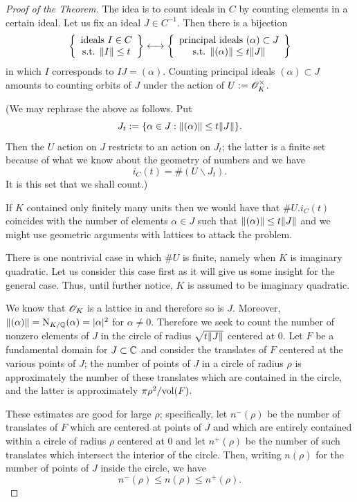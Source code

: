 \documentclass[10pt,a4paper,reqno]{amsart}
\begin{document}
\begin{proof}[Proof of the Theorem]
The idea is to count ideals in $C$ by counting elements in a certain ideal.
Let us fix an ideal $J \in C^{-1}$. Then there is a bijection
\[ \left\{
\begin{array}{c}
    \text{ideals } I \in C \\
    \text{s.t. } \| I\| \le t
\end{array}
\right\} \longleftrightarrow
\left\{
\begin{array}{c}
    \text{principal ideals } (\alpha) \subset J \\
    \text{s.t. } \| (\alpha)\| \le t\| J\|
\end{array}
\right\} \] in which $I$ corresponds to $IJ = (\alpha)$. Counting principal
ideals $(\alpha) \subset J$ amounts to counting orbits of $J$ under the action
of $U := \mathscr{O}_K^{\times}$.

(We may rephrase the above as follows. Put \[J_t := \{\alpha\in J :
\| (\alpha)\| \le t\| J\|\}.\] Then the $U$ action on $J$ restricts to an
action on $J_t$; the latter is a finite set because of what we know about the
geometry of numbers and we have \[i_C(t) = \#(U \backslash J_t). \] It is this
set that we shall count.)

If $K$ contained only finitely many units then we would have that $\#U .
i_C(t)$ coincides with the number of elements $\alpha \in J$ such that
$\| (\alpha)\| \le t \| J\|$ and we might use geometric arguments with
lattices to attack the problem.

There is one nontrivial case in which $\#U$ is finite, namely when $K$ is
imaginary quadratic. Let us consider this case first as it will give us some
insight for the general case. Thus, until further notice, $K$ is assumed to be
imaginary quadratic.

We know that $\mathscr{O}_K$ is a lattice in \C{} and therefore so is $J$. Moreover,
$\| (\alpha)\| = \mathrm{N}_{K/\mathbb{Q}}(\alpha) = |\alpha|^2$ for $\alpha\neq 0$.
Therefore we seek to count the number of nonzero elements of $J$ in the circle
of radius $\sqrt{t\| J\|}$ centered at 0. Let $F$ be a fundamental domain for
$J \subset \mathbb{C}$ and consider the translates of $F$ centered at the various
points of $J$; the number of points of $J$ in a circle of radius $\rho$ is
approximately the number of these translates which are contained in the circle,
and the latter is approximately $\pi\rho^2/\mathrm{vol}(F).$

These estimates are good for large $\rho$; specifically, let $n^-(\rho)$ be the
number of translates of $F$ which are centered at points of $J$ and which are
entirely contained within a circle of radius $\rho$ centered at 0 and let
$n^+(\rho)$ be the number of such translates which intersect the interior of
the circle. Then, writing $n(\rho)$ for the number of points of $J$ inside the
circle, we have \[n^-(\rho) \le n(\rho) \le n^+(\rho).\]


\end{proof}
\end{document}
